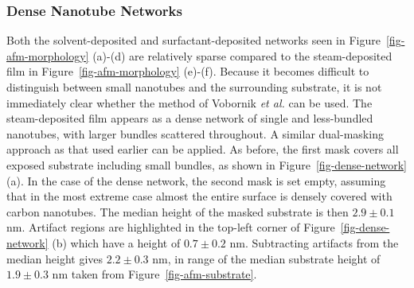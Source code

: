 \documentclass[
  a4paper,
]{scrbook}
\begin{document}
\hypertarget{dense-nanotube-networks}{%
\subsubsection*{Dense Nanotube Networks}\label{dense-nanotube-networks}}

Both the solvent-deposited and surfactant-deposited networks seen in
Figure~\ref{fig-afm-morphology} (a)-(d) are relatively sparse compared
to the steam-deposited film in Figure~\ref{fig-afm-morphology} (e)-(f).
Because it becomes difficult to distinguish between small nanotubes and
the surrounding substrate, it is not immediately clear whether the
method of Vobornik \emph{et al.} can be used. The steam-deposited film
appears as a dense network of single and less-bundled nanotubes, with
larger bundles scattered throughout. A similar dual-masking approach as
that used earlier can be applied. As before, the first mask covers all
exposed substrate including small bundles, as shown in
Figure~\ref{fig-dense-network} (a). In the case of the dense network,
the second mask is set empty, assuming that in the most extreme case
almost the entire surface is densely covered with carbon nanotubes. The
median height of the masked substrate is then \(2.9 \pm 0.1\) nm.
Artifact regions are highlighted in the top-left corner of
Figure~\ref{fig-dense-network} (b) which have a height of
\(0.7 \pm 0.2\) nm. Subtracting artifacts from the median height gives
\(2.2 \pm 0.3\) nm, in range of the median substrate height of
\(1.9 \pm 0.3\) nm taken from Figure~\ref{fig-afm-substrate}.
\end{document}
